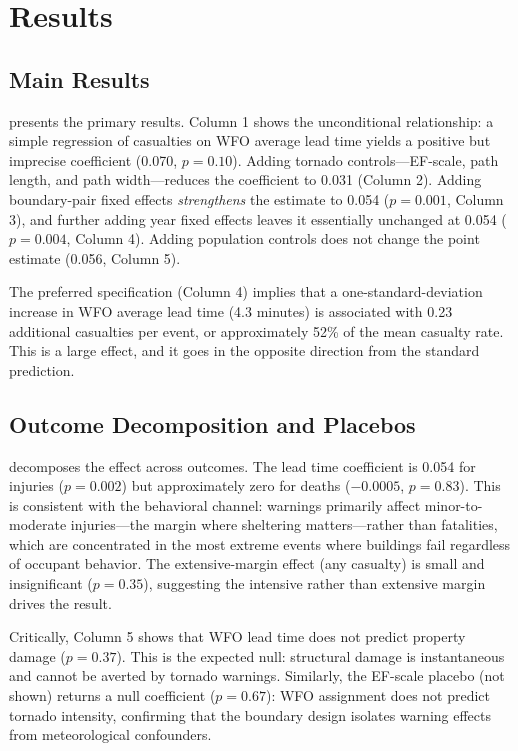 \documentclass[12pt]{article}
\begin{document}
\section{Results}

\subsection{Main Results}



 presents the primary results. Column 1 shows the unconditional relationship: a simple regression of casualties on WFO average lead time yields a positive but imprecise coefficient (0.070, $p = 0.10$). Adding tornado controls---EF-scale, path length, and path width---reduces the coefficient to 0.031 (Column 2). Adding boundary-pair fixed effects \textit{strengthens} the estimate to 0.054 ($p = 0.001$, Column 3), and further adding year fixed effects leaves it essentially unchanged at 0.054 ($p = 0.004$, Column 4). Adding population controls does not change the point estimate (0.056, Column 5).

The preferred specification (Column 4) implies that a one-standard-deviation increase in WFO average lead time (4.3 minutes) is associated with 0.23 additional casualties per event, or approximately 52\% of the mean casualty rate. This is a large effect, and it goes in the opposite direction from the standard prediction.

\subsection{Outcome Decomposition and Placebos}



 decomposes the effect across outcomes. The lead time coefficient is 0.054 for injuries ($p = 0.002$) but approximately zero for deaths ($-0.0005$, $p = 0.83$). This is consistent with the behavioral channel: warnings primarily affect minor-to-moderate injuries---the margin where sheltering matters---rather than fatalities, which are concentrated in the most extreme events where buildings fail regardless of occupant behavior. The extensive-margin effect (any casualty) is small and insignificant ($p = 0.35$), suggesting the intensive rather than extensive margin drives the result.

Critically, Column 5 shows that WFO lead time does not predict property damage ($p = 0.37$). This is the expected null: structural damage is instantaneous and cannot be averted by tornado warnings. Similarly, the EF-scale placebo (not shown) returns a null coefficient ($p = 0.67$): WFO assignment does not predict tornado intensity, confirming that the boundary design isolates warning effects from meteorological confounders.
\end{document}
